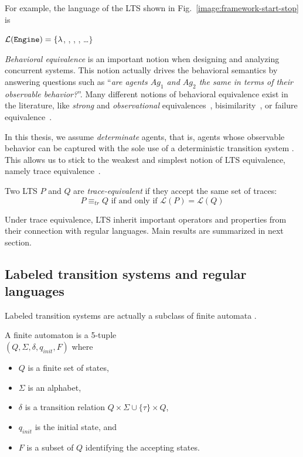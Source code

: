 For example, the language of the LTS shown in Fig.~\ref{image:framework-start-stop} is
\begin{center}
$\mathcal{L}(\texttt{Engine})=\{\lambda$, , , , \ldots $\}$
\end{center} 

\emph{Behavioral equivalence} is an important notion when designing and analyzing concurrent systems. This notion actually drives the behavioral semantics by answering questions such as ``\emph{are agents $Ag_1$ and $Ag_2$ the same in terms of their observable behavior?}''. Many different notions of behavioral equivalence exist in the literature, like \emph{strong} and \emph{observational} equivalences~\cite{Milner:1989}, bisimilarity~\cite{Park:1981}, or failure equivalence~\cite{Hoare:1985}. 

In this thesis, we assume \emph{determinate} agents, that is, agents whose observable behavior can be captured with the sole use of a deterministic transition system \cite{Engelfriet:1985}. This allows us to stick to the weakest and simplest notion of LTS equivalence, namely trace equivalence~\cite{Hoare:1985, Engelfriet:1985}. 

\begin{definition}
Two LTS $P$ and $Q$ are \emph{trace-equivalent} if they accept the same set of traces:
\begin{equation*}
P \equiv_{tr} Q \mbox{~if and only if~} \mathcal{L}(P) = \mathcal{L}(Q)
\end{equation*}
\end{definition}

Under trace equivalence, LTS inherit important operators and properties from their connection with regular languages. Main results are summarized in next section.

\subsection{Labeled transition systems and regular languages\label{section:background-lts-and-regular-languages}}

Labeled transition systems are actually a subclass of finite automata \cite{Hopcroft:1979}. 

\begin{definition}
A finite automaton is a 5-tuple \\ $(Q,\Sigma,\delta,q_{init},F)$ where 
\begin{itemize}
\item $Q$ is a finite set of states, 
\item $\Sigma$ is an alphabet, 
\item $\delta$ is a transition relation $Q \times \Sigma\cup\{\tau\} \times Q$, 
\item $q_{init}$ is the initial state, and 
\item $F$ is a subset of $Q$ identifying the accepting states. 
\end{itemize}
\end{definition}

